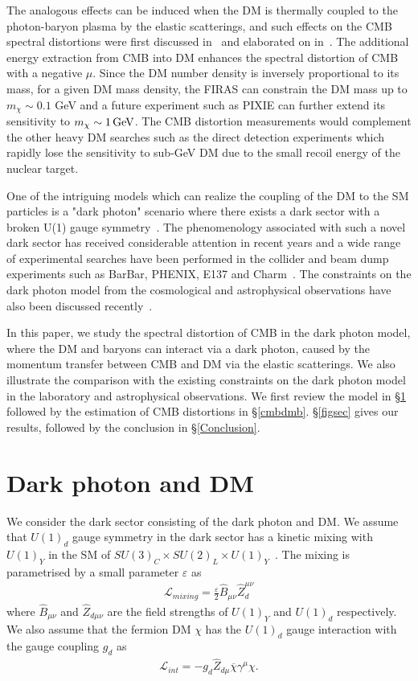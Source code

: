 \documentclass[5p,times]{elsarticle}
\newcommand{\dis}[1]{\begin{equation}\begin{split}#1\end{split}\end{equation}}
\newcommand\gev{\,{\rm GeV}}
\begin{document}
The analogous effects can be induced when the DM is thermally coupled to the photon-baryon plasma by the elastic scatterings, and such effects on the CMB spectral distortions were first discussed in~\cite{tashiro2014}  and elaborated on in~\cite{Ali-Haimoud:2015pwa}. 
The additional energy extraction from CMB into DM  enhances the spectral distortion of CMB with a negative $\mu$. Since the DM number density is inversely proportional to its mass, for a given DM mass density, the FIRAS can constrain the DM mass up to $m_{\chi}\sim 0.1$ GeV and a future experiment such as PIXIE can further extend its sensitivity to $m_{\chi} \sim 1\gev$. The CMB distortion measurements would complement the other heavy DM searches such as the direct detection experiments which rapidly lose the sensitivity to sub-GeV DM due to the small recoil energy of the nuclear target.


One of the intriguing models which can realize the coupling of the DM to the SM particles  is a "dark photon" scenario where there exists a dark sector with a broken U(1) gauge symmetry~\cite{Okun:1982xi,Holdom:1985ag}. The phenomenology associated with such a novel dark sector has received considerable attention in recent years and a wide range of experimental searches have been performed in the collider and beam dump experiments such as BarBar, PHENIX, E137 and Charm~\cite{Davoudiasl:2012ag,Essig:2013lka,Adare:2014mgk,Goudzovski:2014rwa,Lees:2015rxq,Alekhin:2015byh}. 
  The constraints on the dark photon model from the cosmological and astrophysical observations have also been discussed recently~\cite{Dvorkin:2013cea,Berger:2016vxi}. 
  

In this paper, we study the spectral distortion of CMB in the dark photon model, where the DM and baryons can interact via a dark photon, caused by the momentum transfer between CMB and DM via the elastic scatterings. We also illustrate the comparison with the existing constraints on the dark photon model in the laboratory and astrophysical observations. We first review the model in \S \ref{model} followed by the estimation of CMB distortions in \S \ref{cmbdmb}.
\S \ref{figsec} gives our results, followed by the conclusion in \S \ref{Conclusion}.


\section{Dark photon and DM}
\label{model}
We consider the dark sector consisting of the dark photon and DM.
We assume that $U(1)_d$ gauge symmetry in the dark sector has a kinetic mixing with $U(1)_Y$ in the SM of  $SU(3)_C\times SU(2)_L\times U(1)_Y$~\cite{Okun:1982xi, Holdom:1985ag}. The mixing is parametrised by a small parameter $\varepsilon$ as
\dis{
   \mathcal{L}_{mixing} =  \frac{\varepsilon}{2} \hat{B}_{\mu \nu}\hat{Z}_d^{\mu \nu}
   \label{mixing}
}
 where $\hat{B}_{\mu \nu}$ and $\hat{Z}_{d\mu \nu}$ are the field strengths of $U(1)_Y$ and $U(1)_d$ respectively.
We also assume that the fermion DM $\chi$ has the  $U(1)_d$ gauge interaction with the gauge coupling $g_d$ as
\dis{
  \mathcal{L}_{int} = -g_d \hat{Z}_{d\mu}\overline{\chi}\gamma^\mu\chi.
} 
\end{document}
